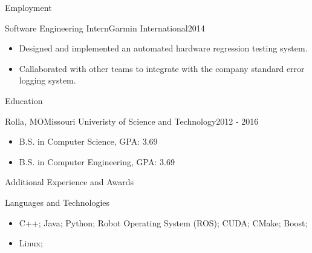 \documentclass[]{mcdowellcv}
\begin{document}
\begin{cvsection}{Employment}
        \begin{cvsubsection}{Software Engineering Intern}{Garmin International}{2014}	
			\begin{itemize}
			    \item Designed and implemented an automated hardware regression testing system.
                \item Callaborated with other teams to integrate with the company standard error logging system.
			\end{itemize}
		\end{cvsubsection}
	\end{cvsection}
	
	\begin{cvsection}{Education}
		\begin{cvsubsection}{Rolla, MO}{Missouri Univeristy of Science and Technology}{2012 - 2016}
			\begin{itemize}
				\item B.S. in Computer Science, GPA: 3.69
                \item B.S. in Computer Engineering, GPA: 3.69
			\end{itemize}
		\end{cvsubsection}
	\end{cvsection}	
	
	\begin{cvsection}{Additional Experience and Awards}
		\begin{cvsubsection}{}{}{}	
			\begin{itemize}	
			\end{itemize}
		\end{cvsubsection}
	\end{cvsection}
	
	\begin{cvsection}{Languages and Technologies}
		\begin{cvsubsection}{}{}{}	
			\begin{itemize}
                \item C++; Java; Python; Robot Operating System (ROS); CUDA; CMake; Boost; 
				\item Linux;
			\end{itemize}
		\end{cvsubsection}
	\end{cvsection}
	
\end{document}
